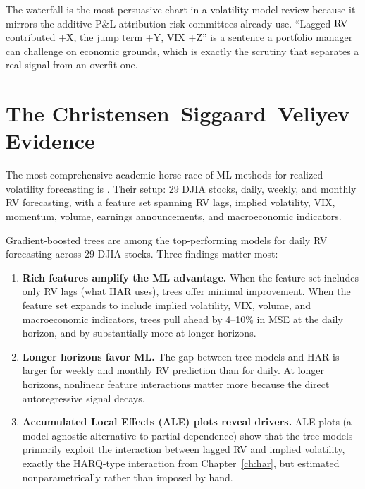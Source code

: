 \begin{projectconnection}
The waterfall is the most persuasive chart in a volatility-model
review because it mirrors the additive P\&L attribution risk committees
already use.  ``Lagged $\operatorname{RV}$ contributed $+$X, the jump term $+$Y, VIX $+$Z''
is a sentence a portfolio manager can challenge on economic grounds, which is
exactly the scrutiny that separates a real signal from an overfit one.
\end{projectconnection}



\section{The Christensen--Siggaard--Veliyev Evidence}\label{sec:trees:csv}

The most comprehensive academic horse-race of ML methods for realized
volatility forecasting is \citet{ChristensenSiggaardVeliyev2023}.  Their
setup: 29 DJIA stocks, daily, weekly, and monthly RV forecasting, with a
feature set spanning RV lags, implied volatility, VIX, momentum, volume,
earnings announcements, and macroeconomic indicators.

\begin{keyresult}
Gradient-boosted trees are among the top-performing models for
daily RV forecasting across 29 DJIA stocks.  Three findings matter most:

\begin{enumerate}[leftmargin=1.8em]
\item \textbf{Rich features amplify the ML advantage.}
  When the feature set includes only RV lags (what HAR uses), trees offer
  minimal improvement.  When the feature set expands to include implied
  volatility, VIX, volume, and macroeconomic indicators, trees pull ahead
  by 4--10\% in MSE at the daily horizon, and by substantially more at
  longer horizons.

\item \textbf{Longer horizons favor ML.}
  The gap between tree models and HAR is larger for weekly and monthly RV
  prediction than for daily.  At longer horizons, nonlinear feature
  interactions matter more because the direct autoregressive signal decays.

\item \textbf{Accumulated Local Effects (ALE) plots reveal drivers.}
  ALE plots (a model-agnostic alternative to partial dependence) show that
  the tree models primarily exploit the interaction between lagged RV and
  implied volatility, exactly the HARQ-type interaction from
  Chapter~\ref{ch:har}, but estimated nonparametrically rather than
  imposed by hand.
\end{enumerate}
\end{keyresult}

